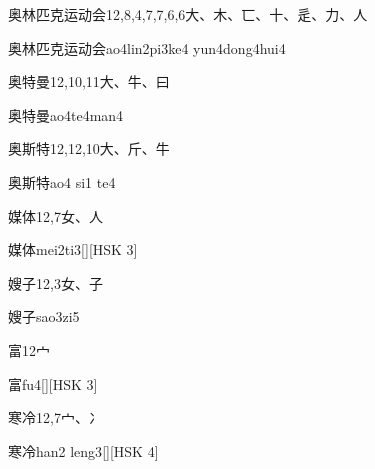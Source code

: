 \begin{entry}{奥林匹克运动会}{12,8,4,7,7,6,6}{⼤、⽊、⼖、⼗、⾡、⼒、⼈}
  \begin{phonetics}{奥林匹克运动会}{ao4lin2pi3ke4 yun4dong4hui4}
  \end{phonetics}
\end{entry}

\begin{entry}{奥特曼}{12,10,11}{⼤、⽜、⽈}
  \begin{phonetics}{奥特曼}{ao4te4man4}
  \end{phonetics}
\end{entry}

\begin{entry}{奥斯特}{12,12,10}{⼤、⽄、⽜}
  \begin{phonetics}{奥斯特}{ao4 si1 te4}
  \end{phonetics}
\end{entry}

\begin{entry}{媒体}{12,7}{⼥、⼈}
  \begin{phonetics}{媒体}{mei2ti3}[][HSK 3]
  \end{phonetics}
\end{entry}

\begin{entry}{嫂子}{12,3}{⼥、⼦}
  \begin{phonetics}{嫂子}{sao3zi5}
  \end{phonetics}
\end{entry}

\begin{entry}{富}{12}{⼧}
  \begin{phonetics}{富}{fu4}[][HSK 3]
  \end{phonetics}
\end{entry}

\begin{entry}{寒冷}{12,7}{⼧、⼎}
  \begin{phonetics}{寒冷}{han2 leng3}[][HSK 4]
  \end{phonetics}
\end{entry}

